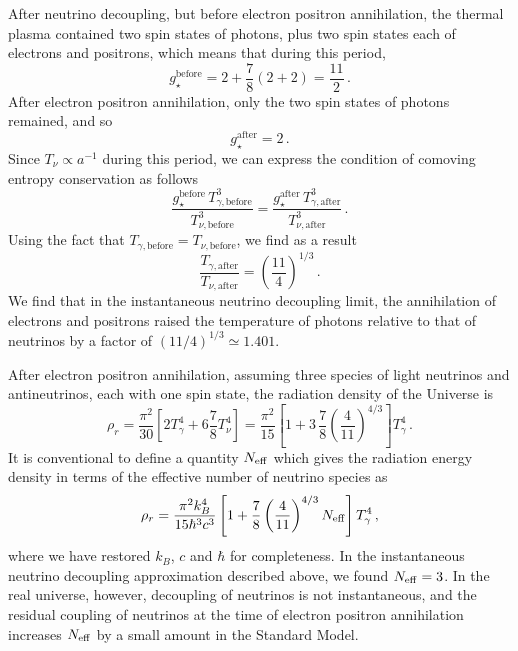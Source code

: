 After neutrino decoupling, but before electron positron annihilation, the thermal plasma contained two spin states of photons, plus two spin states each of electrons and positrons, which means that during this period,
\begin{equation}
	g_{\star}^{\mathrm{before}} = 2 + \frac{7}{8}(2+2) = \frac{11}{2} \, .
\end{equation}
After electron positron annihilation, only the two spin states of photons remained, and so
\begin{equation}
	g_\star^{\mathrm{after}} = 2 \, .
\end{equation}
Since $T_\nu\propto a^{-1}$ during this period, we can express the condition of comoving entropy conservation as follows
\begin{equation}
	\frac{g_{\star}^{\mathrm{before}} \, T_{\gamma,\mathrm{before}}^3}{T_{\nu,\mathrm{before}}^3} = \frac{g_\star^{\mathrm{after}} \, T_{\gamma,\mathrm{after}}^3}{T_{\nu,\mathrm{after}}^3} \, .
\end{equation}
Using the fact that $T_{\gamma,\mathrm{before}} = T_{\nu,\mathrm{before}}$, we find as a result
\begin{equation}
	\frac{T_{\gamma,\mathrm{after}}}{T_{\nu,\mathrm{after}}} = \left(\frac{11}{4}\right)^{1/3} \, .
\end{equation}
We find that in the instantaneous neutrino decoupling limit, the annihilation of electrons and positrons raised the temperature of photons relative to that of neutrinos by a factor of $(11/4)^{1/3}\simeq1.401$.

After electron positron annihilation, assuming three species of light neutrinos and antineutrinos, each with one spin state, the radiation density of the Universe is
\begin{equation}
	\rho_r = \frac{\pi^2}{30}\left[2T_\gamma^4 + 6\frac{7}{8}T_\nu^4\right] = \frac{\pi^2}{15}\left[1+3\,\frac{7}{8}\left(\frac{4}{11}\right)^{4/3}\right] T_\gamma^4 \, .
\end{equation}
It is conventional to define a quantity $N_{\rm eff}$ which gives the radiation energy density in terms of the effective number of neutrino species as
\begin{equation}\label{eq:rho_r_Neff}
	\rho_r = \frac{\pi^2k_B^4}{15\hbar^3 c^3}\left[1+\frac{7}{8}\left(\frac{4}{11}\right)^{4/3}N_{\rm eff}\right] T_\gamma^4 \, ,
\end{equation}
where we have restored $k_B$, $c$ and $\hbar$ for completeness.  In the instantaneous neutrino decoupling approximation described above, we found $N_{\rm eff} = 3$.  In the real universe, however, decoupling of neutrinos is not instantaneous, and the residual coupling of neutrinos at the time of electron positron annihilation increases $N_{\rm eff}$ by a small amount in the Standard Model.

